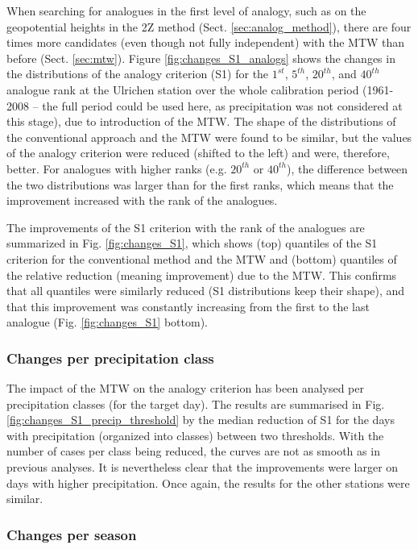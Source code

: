 \documentclass[hess, manuscript]{copernicus}
\begin{document}
	When searching for analogues in the first level of analogy, such as on the geopotential heights in the 2Z method (Sect. \ref{sec:analog_method}), there are four times more candidates (even though not fully independent) with the MTW than before (Sect. \ref{sec:mtw}). Figure \ref{fig:changes_S1_analogs} shows the changes in the distributions of the analogy criterion (S1) for the $1^{st}$, $5^{th}$, $20^{th}$, and $40^{th}$ analogue rank at the Ulrichen station over the whole calibration period (1961-2008 -- the full period could be used here, as precipitation was not considered at this stage), due to introduction of the MTW. The shape of the distributions of the conventional approach and the MTW were found to be similar, but the values of the analogy criterion were reduced (shifted to the left) and were, therefore, better. For analogues with higher ranks (e.g. $20^{th}$ or $40^{th}$), the difference between the two distributions was larger than for the first ranks, which means that the improvement increased with the rank of the analogues. 
	
	The improvements of the S1 criterion with the rank of the analogues are summarized in Fig. \ref{fig:changes_S1}, which shows (top) quantiles of the S1 criterion for the conventional method and the MTW and (bottom) quantiles of the relative reduction (meaning improvement) due to the MTW. This confirms that all quantiles were similarly reduced (S1 distributions keep their shape), and that this improvement was constantly increasing from the first to the last analogue (Fig. \ref{fig:changes_S1} bottom).
	
	
	\subsubsection{Changes per precipitation class}
	\label{sec:influence_precip}
	
	The impact of the MTW on the analogy criterion has been analysed per precipitation classes (for the target day). The results are summarised in Fig. \ref{fig:changes_S1_precip_threshold} by the median reduction of S1 for the days with precipitation (organized into classes) between two thresholds. With the number of cases per class being reduced, the curves are not as smooth as in previous analyses. It is nevertheless clear that the improvements were larger on days with higher precipitation. Once again, the results for the other stations were similar.
	
	
	\subsubsection{Changes per season}
	\label{sec:seasonal_effect}
	
\end{document}
